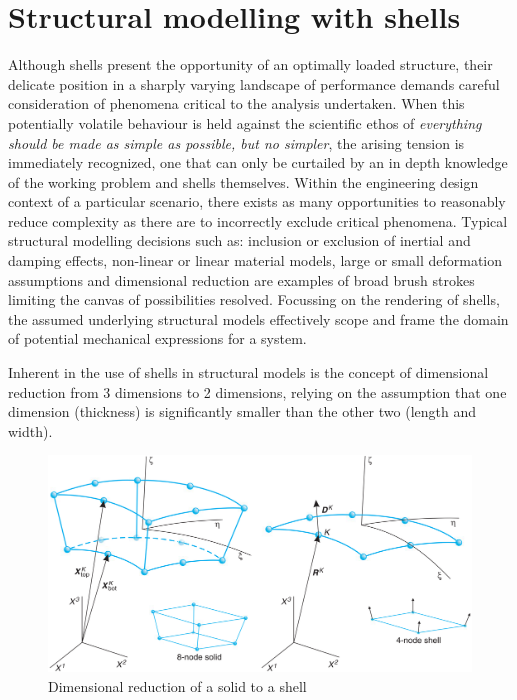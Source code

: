 \section{Structural modelling with shells}
\label{Structural modelling with shells}
Although shells present the opportunity of an optimally loaded structure, their delicate position in a sharply varying landscape of performance demands careful consideration of phenomena critical to the analysis undertaken. When this potentially volatile behaviour is held against the scientific ethos of \textit{everything should be made as simple as possible, but no simpler}, the arising tension is immediately recognized, one that can only be curtailed by an in depth knowledge of the working problem and shells themselves. Within the engineering design context of a particular scenario, there exists as many opportunities to reasonably reduce complexity as there are to incorrectly exclude critical phenomena. Typical structural modelling decisions such as: inclusion or exclusion of inertial and damping effects, non-linear or linear material models, large or small deformation assumptions and dimensional reduction are examples of broad brush strokes limiting the canvas of possibilities resolved. Focussing on the rendering of shells, the assumed underlying structural models  effectively scope and frame the domain of potential mechanical expressions for a system.

Inherent in the use of shells in structural models is the concept of dimensional reduction from 3 dimensions to 2 dimensions, relying on the assumption that one dimension (thickness) is significantly smaller than the other two (length and width). 

\begin{figure}[H]
	\centering
	\def\svgwidth{\columnwidth}
	\includegraphics[width=12cm]{images/degenerateshell.png}
	\caption{Dimensional reduction of a solid to a shell \cite{BischLitBook04}}
	\label{dimReduction}
\end{figure}

